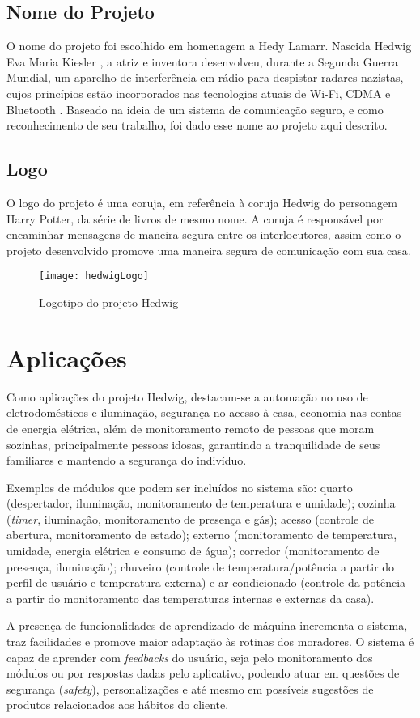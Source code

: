 \subsection{Nome do Projeto}
O nome do projeto foi escolhido em homenagem a Hedy Lamarr. Nascida Hedwig Eva Maria Kiesler \cite{shearer}, a atriz e inventora desenvolveu, durante a Segunda Guerra Mundial, um aparelho de interferência em rádio para despistar radares nazistas, cujos princípios estão incorporados nas tecnologias atuais de Wi-Fi, CDMA e Bluetooth \cite{electronicFrontier}. Baseado na ideia de um sistema de comunicação seguro, e como reconhecimento de seu trabalho, foi dado esse nome ao projeto aqui descrito.

\subsection{Logo}
O logo do projeto é uma coruja, em referência à coruja Hedwig do personagem Harry Potter, da série de livros de mesmo nome. A coruja é responsável por encaminhar mensagens de maneira segura entre os interlocutores, assim como o projeto desenvolvido promove uma maneira segura de comunicação com sua casa.

\begin{figure}[H]
	\centering
	\caption{Logotipo do projeto Hedwig}
  \texttt{[image: hedwigLogo]}
\label{fig:hedwigLogo}
\end{figure}

\section{Aplicações}
Como aplicações do projeto Hedwig, destacam-se a automação no uso de eletrodomésticos e iluminação, segurança no acesso à casa, economia nas contas de energia elétrica, além de  monitoramento remoto de pessoas que moram sozinhas, principalmente pessoas idosas, garantindo a tranquilidade de seus familiares e mantendo a segurança do indivíduo.

Exemplos de módulos que podem ser incluídos no sistema são: quarto (despertador, iluminação, monitoramento de temperatura e umidade); cozinha (\textit{timer}, iluminação, monitoramento de presença e gás); acesso (controle de abertura, monitoramento de estado); externo (monitoramento de temperatura, umidade, energia elétrica e consumo de água); corredor (monitoramento de presença, iluminação); chuveiro (controle de temperatura\slash potência a partir do perfil de usuário e temperatura externa) e ar condicionado (controle da potência a partir do monitoramento das temperaturas internas e externas da casa).

A presença de funcionalidades de aprendizado de máquina incrementa o sistema, traz facilidades e promove maior adaptação às rotinas dos moradores. O sistema é capaz de aprender com \emph{feedbacks} do usuário, seja pelo monitoramento dos módulos ou por respostas dadas pelo aplicativo, podendo atuar em questões de segurança (\emph{safety}), personalizações e até mesmo em possíveis sugestões de produtos relacionados aos hábitos do cliente.
